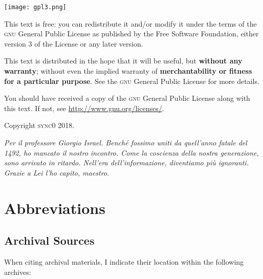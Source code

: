 \documentclass[version=last,draft=true,paper=A4,portrait,twoside=true,twocolumn=false,headinclude=false,footinclude=false,fontsize=11,BCOR=20mm,DIV=calc,pagesize=auto,titlepage=firstiscover,mpinclude=false,open=right,chapterprefix=true,numbers=autoendperiod,headsepline=false,parskip=false]{scrbook}
\begin{document}
\newpage
\vspace*{\fill}
\noindent
\texttt{[image: gpl3.png]}\par
\vspace{1\baselineskip}
This text is free: you can redistribute it and/or modify it
under the terms of the \textsc{gnu} General Public License as published by
the Free Software Foundation, either version 3 of the License or any later
version.

This text is distributed in the hope that it will be useful, but \textbf{without
any warranty}; without even the implied warranty of \textbf{merchantability or 
fitness for a particular purpose}. See the \textsc{gnu} General 
Public License for more details.

You should have received a copy of the \textsc{gnu} General Public License along
with this text. If not, see \url{http://www.gnu.org/licenses/}.

\vspace{1\baselineskip}
\noindent
Copyright \textcopyright \textsc{sync0} 2018. 

\newpage\null\newpage

\begin{FlushRight}
\begin{italian}
\textit{Per il professore Giorgio Israel. \newline Benché fossimo uniti da quell'anno fatale del 1492, \linebreak ho mancato il nostro incontro. \linebreak Come la coscienza della nostra generazione, \linebreak sono arrivato in ritardo. \linebreak Nell'era dell'informazione, diventiamo più ignoranti. \linebreak Grazie a Lei l'ho capito, maestro.}
\end{italian}
\end{FlushRight}

\newpage
\tableofcontents 
\frontmatter
\pagestyle{plain}
\chapter*{Abbreviations} 
\section*{Archival Sources}

When citing archival materials, I indicate their location within the
following archives:
\end{document}

